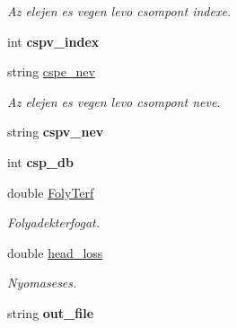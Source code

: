 \begin{DoxyCompactItemize}
\begin{DoxyCompactList}\small\item\em Az elejen es vegen levo csompont indexe. \end{DoxyCompactList}\item 
int {\bfseries cspv\+\_\+index}\hypertarget{class_agelem_a58103d621323b8cc243fa8e7e3afd15d}{}\label{class_agelem_a58103d621323b8cc243fa8e7e3afd15d}

\item 
string \hyperlink{class_agelem_aba3d9c5d2eed320e7a0531e99188a73a}{cspe\+\_\+nev}\hypertarget{class_agelem_aba3d9c5d2eed320e7a0531e99188a73a}{}\label{class_agelem_aba3d9c5d2eed320e7a0531e99188a73a}

\begin{DoxyCompactList}\small\item\em Az elejen es vegen levo csompont neve. \end{DoxyCompactList}\item 
string {\bfseries cspv\+\_\+nev}\hypertarget{class_agelem_ac637696905966c41ddc21c708c653991}{}\label{class_agelem_ac637696905966c41ddc21c708c653991}

\item 
int {\bfseries csp\+\_\+db}\hypertarget{class_agelem_a2cf9ad5c8991d7bfc41754126a1a82f6}{}\label{class_agelem_a2cf9ad5c8991d7bfc41754126a1a82f6}

\item 
double \hyperlink{class_agelem_ab235bccddd3f04b9f4e991ee8f3dd8ff}{Foly\+Terf}\hypertarget{class_agelem_ab235bccddd3f04b9f4e991ee8f3dd8ff}{}\label{class_agelem_ab235bccddd3f04b9f4e991ee8f3dd8ff}

\begin{DoxyCompactList}\small\item\em Folyadekterfogat. \end{DoxyCompactList}\item 
double \hyperlink{class_agelem_a723a132d3fc5ce069b16f22d169d9772}{head\+\_\+loss}\hypertarget{class_agelem_a723a132d3fc5ce069b16f22d169d9772}{}\label{class_agelem_a723a132d3fc5ce069b16f22d169d9772}

\begin{DoxyCompactList}\small\item\em Nyomaseses. \end{DoxyCompactList}\item 
string {\bfseries out\+\_\+file}\hypertarget{class_agelem_a79b5d0684f173c6cbd98530583352211}{}\label{class_agelem_a79b5d0684f173c6cbd98530583352211}


\end{DoxyCompactItemize}
